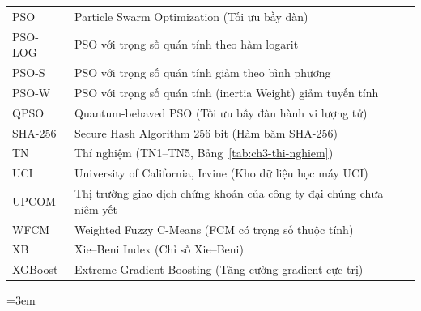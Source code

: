 \documentclass[a4paper,12pt,oneside]{report}
\begin{document}
{\begin{longtable}{@{}lp{11.5cm}@{}}
PSO     & Particle Swarm Optimization (Tối ưu bầy đàn) \\
PSO-LOG & PSO với trọng số quán tính theo hàm logarit \\
PSO-S   & PSO với trọng số quán tính giảm theo bình phương \\
PSO-W   & PSO với trọng số quán tính (inertia Weight) giảm tuyến tính \\
QPSO    & Quantum-behaved PSO (Tối ưu bầy đàn hành vi lượng tử) \\
SHA-256 & Secure Hash Algorithm 256 bit (Hàm băm SHA-256) \\
TN      & Thí nghiệm (TN1--TN5, Bảng~\ref{tab:ch3-thi-nghiem}) \\
UCI     & University of California, Irvine (Kho dữ liệu học máy UCI) \\
UPCOM   & Thị trường giao dịch chứng khoán của công ty đại chúng chưa niêm yết \\
WFCM    & Weighted Fuzzy C-Means (FCM có trọng số thuộc tính) \\
XB      & Xie--Beni Index (Chỉ số Xie--Beni) \\
XGBoost & Extreme Gradient Boosting (Tăng cường gradient cực trị) \\
\bottomrule
\end{longtable}
}

\newpage










\newpage
\begingroup\sloppy\emergencystretch=3em
\printbibliography[title={TÀI LIỆU THAM KHẢO}]
\endgroup


\appendix
{}

\end{document}
